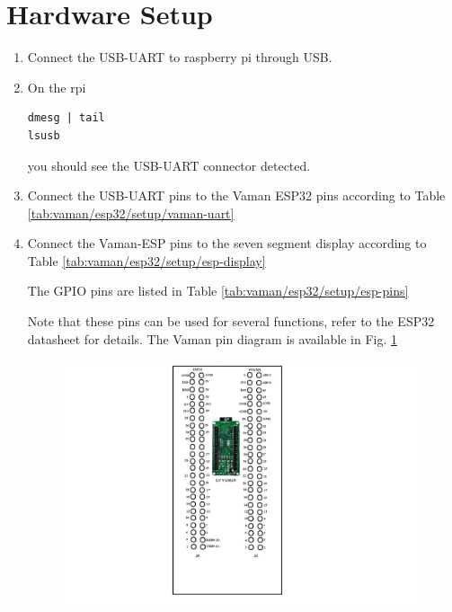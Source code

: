 \documentclass[journal,12pt,twocolumn]{IEEEtran}
\renewcommand\thesection{\arabic{section}}
\begin{document}
\section{Hardware Setup}
\renewcommand{\theequation}{\theenumi}
\renewcommand{\thefigure}{\theenumi}
\begin{enumerate}[label=\thesection.\arabic*.,ref=\thesection.\theenumi]
%
\item Connect the USB-UART to raspberry pi through USB.  
\item On the rpi
\begin{lstlisting}
dmesg | tail
lsusb
\end{lstlisting}
you should see the USB-UART connector detected. 
\item Connect the USB-UART pins to the Vaman ESP32 pins according to Table 
		\ref{tab:vaman/esp32/setup/vaman-uart}
	\begin{table}[!h]
		
		\caption{}
		\label{tab:vaman/esp32/setup/vaman-uart}
	\end{table}

\item Connect the Vaman-ESP pins to the seven segment display  according to Table 
		\ref{tab:vaman/esp32/setup/esp-display}
	\begin{table}[!h]
		
		\caption{}
		\label{tab:vaman/esp32/setup/esp-display}
	\end{table}
	The GPIO pins are listed in Table 
		\ref{tab:vaman/esp32/setup/esp-pins}
	\begin{table}[!h]
		
		\caption{}
		\label{tab:vaman/esp32/setup/esp-pins}
	\end{table}
	Note that these pins can be used for several functions, refer to the ESP32 datasheet
		for details.  The Vaman pin diagram is available in 
		Fig. \ref{fig:vaman/esp32/setup/lc}
	\begin{figure}[!h]
		\includegraphics[width=\columnwidth]{vaman/esp32/setup/figs/lc.jpg}
		\caption{}
		\label{fig:vaman/esp32/setup/lc}
	\end{figure}
\end{enumerate}
%
\end{document}

